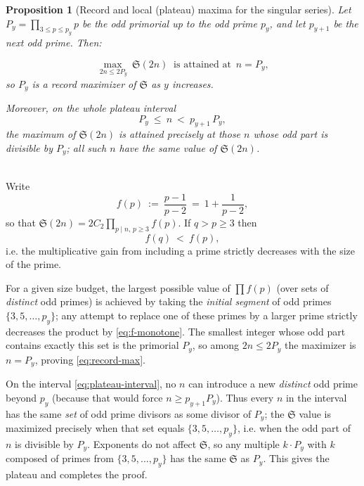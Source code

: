 \documentclass[11pt]{article}
\makeatletter
\theoremstyle{inline}
\theoremstyle{break}
\renewenvironment{proof}[1][\proofname]{%
  \par\pushQED{\qed}%
  \normalfont \topsep6\p@\@plus6\p@\relax
  \trivlist
  \item[\hskip\labelsep
        \itshape
    #1\@addpunct{.}]\mbox{}\\  %
}{%
  \popQED\endtrivlist\@endpefalse
}
\theoremstyle{break}
\theoremstyle{break}
\theoremstyle{break}
\newtheorem{proposition}{Proposition}
\theoremstyle{break}
\theoremstyle{break}
\theoremstyle{break}
\theoremstyle{inline}
\makeatother
\begin{document}
\begin{proposition}[Record and local (plateau) maxima for the singular series]
\label{prop:primorial-plateau}
Let \(P_y=\prod_{3\le p\le p_y}p\) be the odd primorial up to the odd prime \(p_y\), and let \(p_{y+1}\) be the next odd prime. Then:

\begin{equation}\label{eq:record-max}
\max_{\,2n\le 2P_y}\ \mathfrak S(2n)\ \text{ is attained at }\, n=P_y,
\end{equation}
so \(P_y\) is a \emph{record} maximizer of \(\mathfrak S\) as \(y\) increases.

Moreover, on the whole \emph{plateau interval}
\begin{equation}\label{eq:plateau-interval}
P_y\ \le\ n\ <\ p_{y+1}\,P_y,
\end{equation}
the maximum of \(\mathfrak S(2n)\) is attained precisely at those \(n\) whose odd part is divisible by \(P_y\); all such \(n\) have the same value of \(\mathfrak S(2n)\).
\end{proposition}

\begin{proof}
Write
\begin{equation}\label{eq:f-def}
f(p)\ :=\ \frac{p-1}{p-2}\ =\ 1+\frac{1}{p-2},
\end{equation}
so that \(\mathfrak S(2n)=2C_2\prod_{p\mid n,\,p\ge 3} f(p)\).
If \(q>p\ge 3\) then
\begin{equation}\label{eq:f-monotone}
f(q)\ <\ f(p),
\end{equation}
i.e. the multiplicative gain from including a prime strictly decreases with the size of the prime.

For a given size budget, the largest possible value of \(\prod f(p)\) (over sets of \emph{distinct} odd primes) is achieved by taking the \emph{initial segment} of odd primes \(\{3,5,\dots,p_y\}\); any attempt to replace one of these primes by a larger prime strictly decreases the product by \eqref{eq:f-monotone}. The smallest integer whose odd part contains exactly this set is the primorial \(P_y\), so among \(2n\le 2P_y\) the maximizer is \(n=P_y\), proving \eqref{eq:record-max}.

On the interval \eqref{eq:plateau-interval}, no \(n\) can introduce a new \emph{distinct} odd prime beyond \(p_y\) (because that would force \(n\ge p_{y+1}P_y\)). Thus every \(n\) in the interval has the same \emph{set} of odd prime divisors as some divisor of \(P_y\); the \(\mathfrak S\) value is maximized precisely when that set equals \(\{3,5,\dots,p_y\}\), i.e. when the odd part of \(n\) is divisible by \(P_y\). Exponents do not affect \(\mathfrak S\), so any multiple \(k\cdot P_y\) with \(k\) composed of primes from \(\{3,5,\dots,p_y\}\) has the same \(\mathfrak S\) as \(P_y\). This gives the plateau and completes the proof.
\end{proof}
\end{document}
